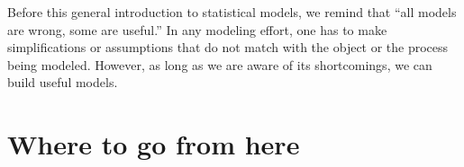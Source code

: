 Before this general introduction to statistical models,
we remind that ``all models are wrong, some are useful.''%
\autocite[p.~424]{box1986}
In any modeling effort,
one has to make simplifications or assumptions that do not match
with the object or the process being modeled.
However,
as long as we are aware of its shortcomings,
we can build useful models.

\section*{Where to go from here}

\textcite{wasserman2004}
